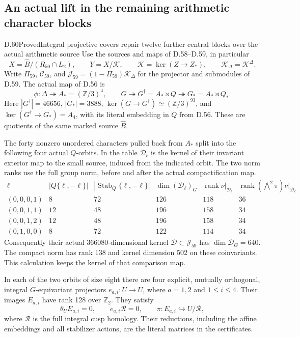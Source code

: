 \subsection{An actual lift in the remaining arithmetic character blocks}

\begin{statement}{D.60}{Proved}{Integral projective covers repair twelve further central blocks over the actual arithmetic source}
Use the sources and maps of D.58--D.59, in particular
\[
 X=\widehat B/(R_{50}\cap L_2),\qquad
 Y=X/\mathcal K,\qquad
 \mathcal K=\ker(Z\to Z_*),\qquad
 \mathcal K_\Delta=\mathcal K^\Delta.
 \tag{D.60.1}
\]
Write \(\Pi_{59}\), \(\mathcal C_{59}\), and
\(\mathcal J_{59}=(1-\Pi_{59})\mathcal K_\Delta\)
for the projector and submodules of D.59.
The actual map of D.56 is
\[
 \phi:\Delta\twoheadrightarrow A_*=(\mathbb Z/3)^4,
 \qquad
 G\twoheadrightarrow G^\dagger=A_*\rtimes Q
       \twoheadrightarrow G_*=A_*\rtimes Q_*.
 \tag{D.60.2}
\]
Here \(|G^\dagger|=46656\), \(|G_*|=3888\),
\(\ker(G\to G^\dagger)\simeq(\mathbb Z/3)^{93}\),
and \(\ker(G^\dagger\to G_*)=A_4\), with its
literal embedding in \(Q\) from D.56. These are
quotients of the same marked source \(\widehat B\).

The forty nonzero unordered characters pulled back
from \(A_*\) split into the following four actual
\(Q\)-orbits. In the table \(\mathcal D_\ell\) is
the kernel of their invariant exterior map to the
small source, induced from the indicated orbit.
The two norm ranks use the full group norm, before
and after the actual compactification map.
\[
\begin{array}{c|r|r|r|r|r}
 \ell&|Q\{\ell,-\ell\}|&|\operatorname{Stab}_Q\{\ell,-\ell\}|
 &\dim(\mathcal D_\ell)_G
 &\operatorname{rank}\nu|_{\mathcal D_\ell}
 &\operatorname{rank}(\bigwedge^2\pi)\nu|_{\mathcal D_\ell}\\\hline
 (0,0,0,1)&8&72&126&118&36\\
 (0,0,1,1)&12&48&196&158&34\\
 (0,0,1,2)&12&48&196&158&34\\
 (0,1,0,0)&8&72&122&114&34
\end{array}
 \tag{D.60.3}
\]
Consequently their actual 366080-dimensional kernel
\(\mathcal D\subset\mathcal J_{59}\) has
\(\dim\mathcal D_G=640\). The compact norm has
rank 138 and kernel dimension 502 on these
coinvariants. This calculation keeps the kernel
of that comparison map.

In each of the two orbits of size eight there are
four explicit, mutually orthogonal, integral
\(G\)-equivariant projectors
\(e_{a,i}:U\to U\), where \(a=1,2\) and
\(1\leq i\leq4\). Their images
\(E_{a,i}\) have rank 128 over \(\mathbb Z_2\).
They satisfy
\[
 \theta_U E_{a,i}=0,\qquad
 e_{a,i}\mathcal R=0,\qquad
 \pi:E_{a,i}\hookrightarrow U/\mathcal R,
 \tag{D.60.4}
\]
where \(\mathcal R\) is the full integral cusp
homology. Their reductions, including the
affine embeddings and all stabilizer actions,
are the literal matrices in the certificates.


\end{statement}

